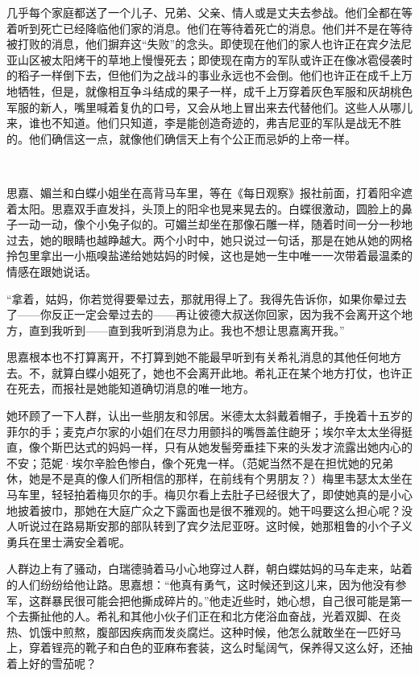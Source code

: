 \par 几乎每个家庭都送了一个儿子、兄弟、父亲、情人或是丈夫去参战。他们全都在等着听到死亡已经降临他们家的消息。他们在等待着死亡的消息。他们并不是在等待被打败的消息，他们摒弃这“失败”的念头。即使现在他们的家人也许正在宾夕法尼亚山区被太阳烤干的草地上慢慢死去；即使现在南方的军队或许正在像冰雹侵袭时的稻子一样倒下去，但他们为之战斗的事业永远也不会倒。他们也许正在成千上万地牺牲，但是，就像相互争斗结成的果子一样，成千上万穿着灰色军服和灰胡桃色军服的新人，嘴里喊着复仇的口号，又会从地上冒出来去代替他们。这些人从哪儿来，谁也不知道。他们只知道，李是能创造奇迹的，弗吉尼亚的军队是战无不胜的。他们确信这一点，就像他们确信天上有个公正而忌妒的上帝一样。
\par  
\par 思嘉、媚兰和白蝶小姐坐在高背马车里，等在《每日观察》报社前面，打着阳伞遮着太阳。思嘉双手直发抖，头顶上的阳伞也晃来晃去的。白蝶很激动，圆脸上的鼻子一动一动，像个小兔子似的。可媚兰却坐在那像石雕一样，随着时间一分一秒地过去，她的眼睛也越睁越大。两个小时中，她只说过一句话，那是在她从她的网格拎包里拿出一小瓶嗅盐递给她姑妈的时候，这也是她一生中唯一一次带着最温柔的情感在跟她说话。
\par “拿着，姑妈，你若觉得要晕过去，那就用得上了。我得先告诉你，如果你晕过去了——你反正一定会晕过去的——再让彼德大叔送你回家，因为我不会离开这个地方，直到我听到——直到我听到消息为止。我也不想让思嘉离开我。”
\par 思嘉根本也不打算离开，不打算到她不能最早听到有关希礼消息的其他任何地方去。不，就算白蝶小姐死了，她也不会离开此地。希礼正在某个地方打仗，也许正在死去，而报社是她能知道确切消息的唯一地方。
\par 她环顾了一下人群，认出一些朋友和邻居。米德太太斜戴着帽子，手挽着十五岁的菲尔的手；麦克卢尔家的小姐们在尽力用颤抖的嘴唇盖住龅牙；埃尔辛太太坐得挺直，像个斯巴达式的妈妈一样，只有从她发髻旁垂挂下来的头发才流露出她内心的不安；范妮·埃尔辛脸色惨白，像个死鬼一样。（范妮当然不是在担忧她的兄弟休，她是不是真的像人们所相信的那样，在前线有个男朋友？）梅里韦瑟太太坐在马车里，轻轻拍着梅贝尔的手。梅贝尔看上去肚子已经很大了，即使她真的是小心地披着披巾，那她在大庭广众之下露面也是很不雅观的。她干吗要这么担心呢？没人听说过在路易斯安那的部队转到了宾夕法尼亚呀。这时候，她那粗鲁的小个子义勇兵在里士满安全着呢。
\par 人群边上有了骚动，白瑞德骑着马小心地穿过人群，朝白蝶姑妈的马车走来，站着的人们纷纷给他让路。思嘉想：“他真有勇气，这时候还到这儿来，因为他没有参军，这群暴民很可能会把他撕成碎片的。”他走近些时，她心想，自己很可能是第一个去撕扯他的人。希礼和其他小伙子们正在和北方佬浴血奋战，光着双脚、在炎热、饥饿中煎熬，腹部因疾病而发炎腐烂。这种时候，他怎么就敢坐在一匹好马上，穿着锃亮的靴子和白色的亚麻布套装，这么时髦阔气，保养得又这么好，还抽着上好的雪茄呢？
